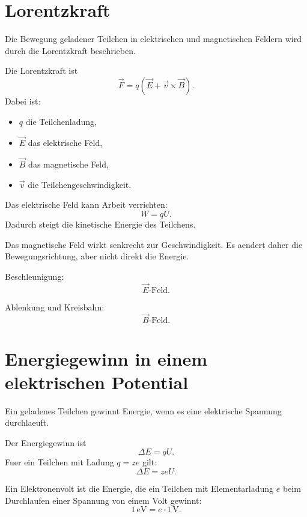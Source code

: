 \section{Lorentzkraft}

Die Bewegung geladener Teilchen in elektrischen und magnetischen Feldern wird durch
die Lorentzkraft beschrieben.

\begin{formulabox}
Die Lorentzkraft ist
\[
    \vec F
    =
    q\left(
        \vec E
        +
        \vec v \times \vec B
    \right).
\]
Dabei ist:
\begin{itemize}
    \item $q$ die Teilchenladung,
    \item $\vec E$ das elektrische Feld,
    \item $\vec B$ das magnetische Feld,
    \item $\vec v$ die Teilchengeschwindigkeit.
\end{itemize}
\end{formulabox}

\begin{conceptbox}
Das elektrische Feld kann Arbeit verrichten:
\[
    W = qU.
\]
Dadurch steigt die kinetische Energie des Teilchens.

Das magnetische Feld wirkt senkrecht zur Geschwindigkeit.
Es aendert daher die Bewegungsrichtung, aber nicht direkt die Energie.
\end{conceptbox}

\begin{examtipbox}
Beschleunigung:
\[
    \vec E \text{-Feld}.
\]

Ablenkung und Kreisbahn:
\[
    \vec B \text{-Feld}.
\]
\end{examtipbox}

\section{Energiegewinn in einem elektrischen Potential}

Ein geladenes Teilchen gewinnt Energie, wenn es eine elektrische Spannung durchlaeuft.

\begin{formulabox}
Der Energiegewinn ist
\[
    \Delta E = qU.
\]
Fuer ein Teilchen mit Ladung $q=ze$ gilt:
\[
    \Delta E = zeU.
\]
\end{formulabox}

\begin{definitionbox}
Ein Elektronenvolt ist die Energie, die ein Teilchen mit Elementarladung $e$ beim
Durchlaufen einer Spannung von einem Volt gewinnt:
\[
    1\,\mathrm{eV}=e\cdot 1\,\mathrm{V}.
\]
\end{definitionbox}

